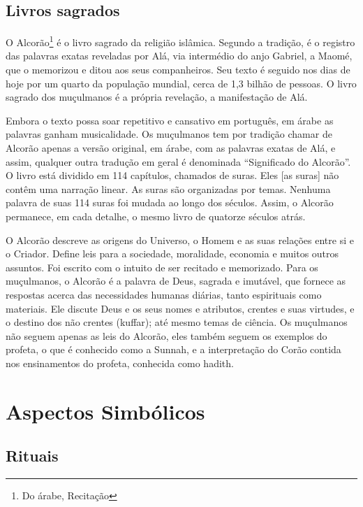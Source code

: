 \documentclass[12pt]{article}
\begin{document}
\subsection{Livros sagrados}
O Alcorão\footnote{Do árabe, Recitação} é o livro sagrado da religião islâmica.
Segundo a tradição, é o registro das palavras exatas reveladas por Alá, via intermédio do anjo Gabriel, a Maomé, que o memorizou e ditou aos seus companheiros.
Seu texto é seguido nos dias de hoje por um quarto da população mundial, cerca de 1,3 bilhão de pessoas.
O livro sagrado dos muçulmanos é a própria revelação, a manifestação de Alá.
\par Embora o texto possa soar repetitivo e cansativo em português, em árabe as palavras ganham musicalidade.
Os muçulmanos tem por tradição chamar de Alcorão apenas a versão original, em árabe, com as palavras exatas de Alá, e assim, qualquer outra tradução em geral é denominada “Significado do Alcorão”.
O livro está dividido em 114 capítulos, chamados de suras. Eles [as suras] não contêm uma narração linear.
As suras são organizadas por temas.
Nenhuma palavra de suas 114 suras foi mudada ao longo dos séculos.
Assim, o Alcorão permanece, em cada detalhe, o mesmo livro de quatorze séculos atrás.
\par O Alcorão descreve as origens do Universo, o Homem e as suas relações entre si e o Criador.
Define leis para a sociedade, moralidade, economia e muitos outros assuntos.
Foi escrito com o intuito de ser recitado e memorizado.
Para os muçulmanos, o Alcorão é a palavra de Deus, sagrada e imutável, que fornece as respostas acerca das necessidades humanas diárias, tanto espirituais como materiais.
Ele discute Deus e os seus nomes e atributos, crentes e suas virtudes, e o destino dos não crentes (kuffar); até mesmo temas de ciência.
Os muçulmanos não seguem apenas as leis do Alcorão, eles também seguem os exemplos do profeta, o que é conhecido como a Sunnah, e a interpretação do Corão contida nos ensinamentos do profeta, conhecida como hadith.

\section{Aspectos Simbólicos}
\subsection{Rituais}
\end{document}
